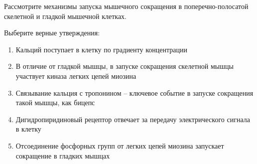 
Рассмотрите механизмы запуска мышечного сокращения
в поперечно-полосатой скелетной и гладкой мышечной клетках.


Выберите
верные утверждения:

\begin{enumerate}
    \item Кальций поступает в клетку по градиенту концентрации
    \item В отличие от гладкой мышцы, в запуске сокращения скелетной мышцы участвует киназа легких цепей миозина
    \item Связывание кальция с тропонином – ключевое событие в запуске сокращения такой мышцы, как бицепс
    \item Дигидропиридиновый рецептор отвечает за передачу электрического сигнала в клетку
    \item Отсоединение фосфорных групп от легких цепей миозина запускает сокращение в гладких мышцах
\end{enumerate}

